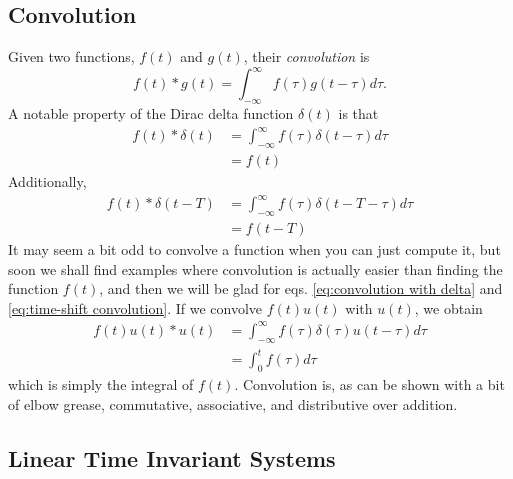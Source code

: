 \documentclass[nobib]{tufte-handout}
\begin{document}
\subsection{Convolution}

Given two functions, $f(t)$ and $g(t)$, their 
\emph{convolution} is 
\[f(t) * g(t) = \int_{-\infty}^{\infty} f(\tau)g(t-\tau)d\tau.\]
A notable property of the Dirac delta function 
$\delta(t)$ is that 
\begin{align} \label{eq:convolution with delta}
    f(t) * \delta(t) &= \int_{-\infty}^{\infty} f(\tau)\delta(t-\tau)d\tau \\
    &= f(t)
\end{align}
Additionally, 
\begin{align} \label{eq:time-shift convolution}
    f(t) * \delta(t - T) &= \int_{-\infty}^{\infty} f(\tau)\delta(t-T-\tau)d\tau \\
    &= f(t - T)
\end{align}
It may seem a bit odd to convolve a function 
when you can just compute it, but soon we shall 
find examples where convolution is actually 
easier than finding the function $f(t)$, and then 
we will be glad for eqs. \ref{eq:convolution with delta}
and \ref{eq:time-shift convolution}.
If we convolve $f(t)u(t)$ with $u(t)$, we obtain 
\begin{align}
    f(t)u(t) * u(t) &= \int_{-\infty}^{\infty} f(\tau)\delta(\tau)u(t-\tau)d\tau \\
    &= \int_{0}^{t} f(\tau) d\tau
\end{align}
which is simply the integral of $f(t)$. 
Convolution is, as can be shown with a bit of elbow 
grease, commutative, associative, and distributive 
over addition. 

\subsection{Linear Time Invariant Systems}
\end{document}
